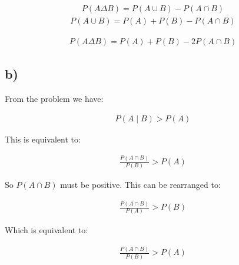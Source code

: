 \documentclass[11pt]{article}
\begin{document}
\begin{equation}
  \begin{align}
    P(A \Delta B) = P(A \cup B) - P(A \cap B)
    \end{align}
\end{equation}
\begin{equation}
  \begin{align}
    P(A \cup B) = P(A) + P(B) - P(A \cap B)
    \end{align}
\end{equation}

\begin{equation}
  \begin{align}
    P(A \Delta B) = P(A) + P(B) - 2P(A \cap B)
    \end{align}
\end{equation}

\subsection*{b)}
\label{sec:org3688b54}

From the problem we have:

\begin{equation}
\begin{align}
P(A\mid B) > P(A)
\end{align}
\end{equation}

This is equivalent to:

\begin{equation}
\begin{align}
  \frac{P(A \cap B)}{P(B)} > P(A)
\end{align}
\end{equation}

So \(P(A \cap B)\) must be positive. This can be rearranged to: 

\begin{equation}
\begin{align}
  \frac{P(A \cap B)}{P(A)} > P(B)
\end{align}
\end{equation}

Which is equivalent to:

\begin{equation}
\begin{align}
  \frac{P(A \cap B)}{P(B)} > P(A)
\end{align}
\end{equation}
\end{document}
